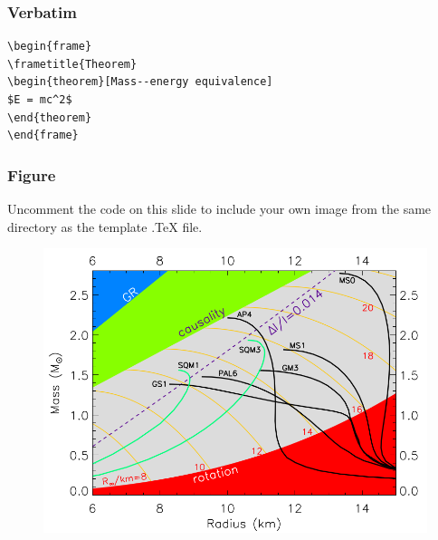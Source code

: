 \documentclass{beamer}
\begin{document}

\begin{frame}[fragile] %
\frametitle{Verbatim}
\begin{example}
\begin{verbatim}
\begin{frame}
\frametitle{Theorem}
\begin{theorem}[Mass--energy equivalence]
$E = mc^2$
\end{theorem}
\end{frame}\end{verbatim}
\end{example}
\end{frame}


\begin{frame}
\frametitle{Figure}
Uncomment the code on this slide to include your own image from the same directory as the template .TeX file.
\begin{figure}
\includegraphics[width=0.8\linewidth]{eos_mr.png}
\end{figure}
\end{frame}


\fi

\end{document}
